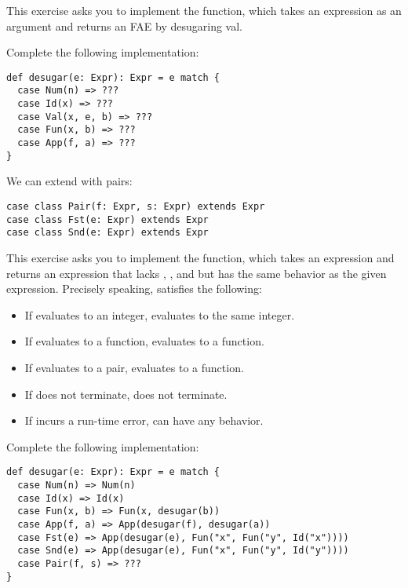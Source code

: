 \begin{exercise}

This exercise asks you to implement the  function, which
takes an \Lang expression as an argument and returns an \textsf{FAE} by
desugaring \textsf{val}.

Complete the following implementation:

\begin{verbatim}
def desugar(e: Expr): Expr = e match {
  case Num(n) => ???
  case Id(x) => ???
  case Val(x, e, b) => ???
  case Fun(x, b) => ???
  case App(f, a) => ???
}
\end{verbatim}

\end{exercise}

\begin{exercise}

We can extend \Lang with pairs:
\begin{verbatim}
case class Pair(f: Expr, s: Expr) extends Expr
case class Fst(e: Expr) extends Expr
case class Snd(e: Expr) extends Expr
\end{verbatim}

This exercise asks you to implement the  function, which takes an
expression and returns an expression that lacks ,
, and  but has the same behavior as the given expression.
Precisely speaking,  satisfies the following:
\begin{itemize}
  \item If  evaluates to an integer,  evaluates to the same integer.
  \item If  evaluates to a function,  evaluates to a function.
  \item If  evaluates to a pair,  evaluates to a function.
  \item If  does not terminate,  does not terminate.
  \item If  incurs a run-time error,  can have any behavior.
\end{itemize}
Complete the following implementation:
\begin{verbatim}
def desugar(e: Expr): Expr = e match {
  case Num(n) => Num(n)
  case Id(x) => Id(x)
  case Fun(x, b) => Fun(x, desugar(b))
  case App(f, a) => App(desugar(f), desugar(a))
  case Fst(e) => App(desugar(e), Fun("x", Fun("y", Id("x"))))
  case Snd(e) => App(desugar(e), Fun("x", Fun("y", Id("y"))))
  case Pair(f, s) => ???
}
\end{verbatim}

\end{exercise}

